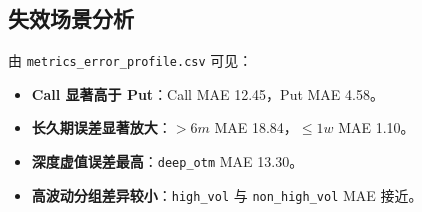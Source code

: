 \documentclass[11pt]{article}
\begin{document}
\subsection{失效场景分析}

由 \texttt{metrics\_error\_profile.csv} 可见：
\begin{itemize}
  \item \textbf{Call 显著高于 Put}：Call MAE 12.45，Put MAE 4.58。
  \item \textbf{长久期误差显著放大}：$>6m$ MAE 18.84，$\le 1w$ MAE 1.10。
  \item \textbf{深度虚值误差最高}：\texttt{deep\_otm} MAE 13.30。
  \item \textbf{高波动分组差异较小}：\texttt{high\_vol} 与 \texttt{non\_high\_vol} MAE 接近。
\end{itemize}
\end{document}
